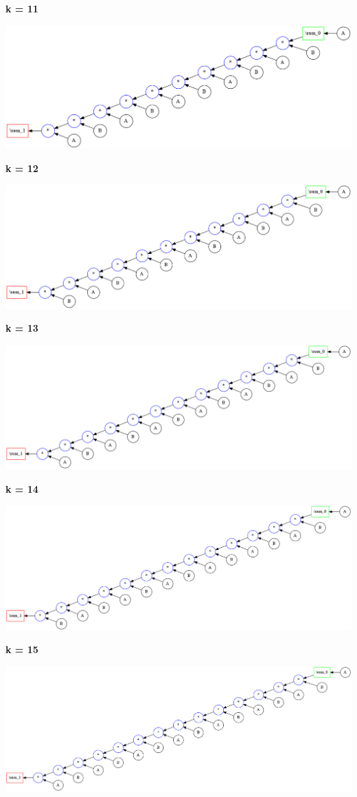 {\bf k = 11}


\begin{center}
\includegraphics[width=0.45\linewidth]{trees/SumAB_11_horizontal_0.png}
\end{center}


{\bf k = 12}


\begin{center}
\includegraphics[width=0.45\linewidth]{trees/SumAB_12_horizontal_0.png}
\end{center}


{\bf k = 13}


\begin{center}
\includegraphics[width=0.45\linewidth]{trees/SumAB_13_horizontal_0.png}
\end{center}


{\bf k = 14}


\begin{center}
\includegraphics[width=0.45\linewidth]{trees/SumAB_14_horizontal_0.png}
\end{center}


{\bf k = 15}


\begin{center}
\includegraphics[width=0.45\linewidth]{trees/SumAB_15_horizontal_0.png}
\end{center}


